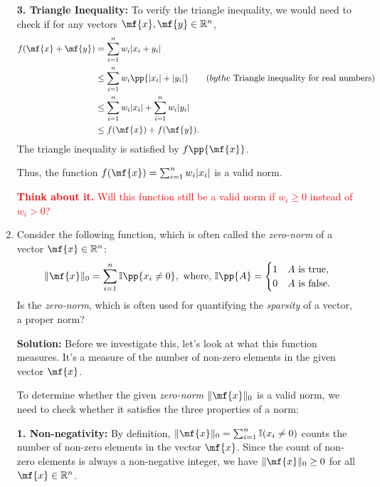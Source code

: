 \begin{enumerate}
\begin{boxedstuff}
        \textbf{3. Triangle Inequality:} 
        To verify the triangle inequality, we would need to check if for any vectors $\mf{x}, \mf{y} \in \mathbb{R}^n$,
        \[ \begin{split}
            f(\mf{x} + \mf{y}) &= \sum_{i=1}^n w_i \vert x_i + y_i \vert \\
            &\leq \sum_{i=1}^n w_i \pp{\vert x_i \vert + \vert y_i \vert} \quad \quad (by the \text{ Triangle inequality for real numbers}) \\
            &\leq \sum_{i=1}^n w_i \vert x_i \vert + \sum_{i=1}^n w_i \vert y_i \vert \\
            &\leq f(\mf{x}) + f(\mf{y}).
        \end{split} \]
        The triangle inequality is satisfied by $f\pp{\mf{x}}$.

        Thus, the function $f(\mf{x}) = \sum_{i=1}^n w_i \vert x_i \vert$ is a valid norm.

        \textcolor{red}{\textbf{Think about it.} Will this function still be a valid norm if $w_i \geq 0$ instead of $w_i > 0$?}
    \end{boxedstuff}

    \item Consider the following function, which is often called the \textit{zero-norm} of a vector $\mf{x} \in \mathbb{R}^n$:
    \[
    \Vert \mf{x} \Vert_0 = \sum_{i=1}^n \mathbb{I}\pp{x_i \neq 0}, \,\, \text{where, } \mathbb{I}\pp{A} = \begin{cases} 1 & A \text{ is true,} \\ 0 & A \text{ is false.} \end{cases}  
    \] 
    Is the \textit{zero-norm}, which is often used for quantifying the \textit{sparsity} of a vector, a proper norm?
    
    \begin{boxedstuff}
        \vspace{4mm}
        \textbf{Solution:} Before we investigate this, let's look at what this function measures. It's a measure of the number of non-zero elements in the given vector $\mf{x}$.
        
        To determine whether the given \textit{zero-norm} $\Vert \mf{x} \Vert_0$ is a valid norm, we need to check whether it satisfies the three properties of a norm:

        \textbf{1. Non-negativity:} 
        By definition, $\Vert \mf{x} \Vert_0 = \sum_{i=1}^n \mathbb{I}(x_i \neq 0)$ counts the number of non-zero elements in the vector $\mf{x}$. Since the count of non-zero elements is always a non-negative integer, we have $\Vert \mf{x} \Vert_0 \geq 0$ for all $\mf{x} \in \mathbb{R}^n$. 


\end{boxedstuff}
\end{enumerate}
